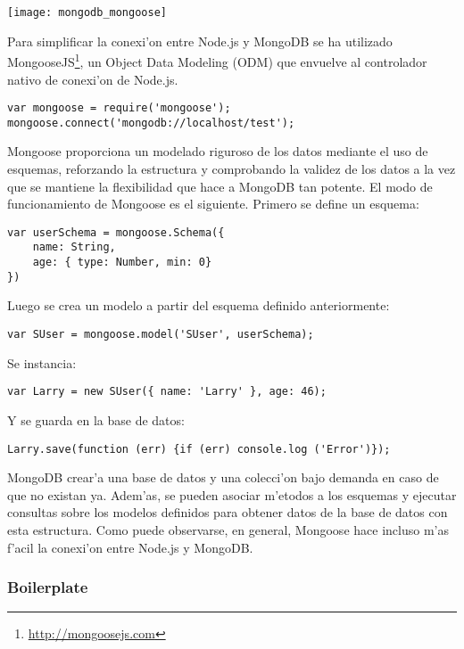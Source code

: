 
\begin{center}
\texttt{[image: mongodb\_mongoose]}
\end{center}

Para simplificar la conexi'on entre Node.js y MongoDB se ha utilizado MongooseJS\footnote{\url{http://mongoosejs.com}}, un
Object Data Modeling (ODM) que envuelve al controlador nativo de conexi'on de Node.js.
\begin{verbatim}
var mongoose = require('mongoose');
mongoose.connect('mongodb://localhost/test');
\end{verbatim}
Mongoose proporciona un modelado riguroso de los datos mediante el uso de esquemas, reforzando la estructura
y comprobando la validez de los datos a la vez que se mantiene la flexibilidad que hace a MongoDB tan
potente. El modo de funcionamiento de Mongoose es el siguiente. Primero se define un esquema:

\begin{verbatim}
var userSchema = mongoose.Schema({
    name: String,
    age: { type: Number, min: 0}
})
\end{verbatim}

Luego se crea un modelo a partir del esquema definido anteriormente:

\begin{verbatim}
var SUser = mongoose.model('SUser', userSchema);
\end{verbatim}

Se instancia:

\begin{verbatim}
var Larry = new SUser({ name: 'Larry' }, age: 46);
\end{verbatim}

Y se guarda en la base de datos:

\begin{verbatim}
Larry.save(function (err) {if (err) console.log ('Error')});
\end{verbatim}

MongoDB crear'a una base de datos y una colecci'on bajo demanda en caso de que no existan ya. Adem'as, se pueden
asociar m'etodos a los esquemas y ejecutar consultas sobre los modelos definidos para obtener datos de la base
de datos con esta estructura. Como puede observarse, en general, Mongoose hace incluso m'as f'acil la conexi'on
entre Node.js y MongoDB.




\subsubsection{Boilerplate}
\label{sub:boilerplate}

